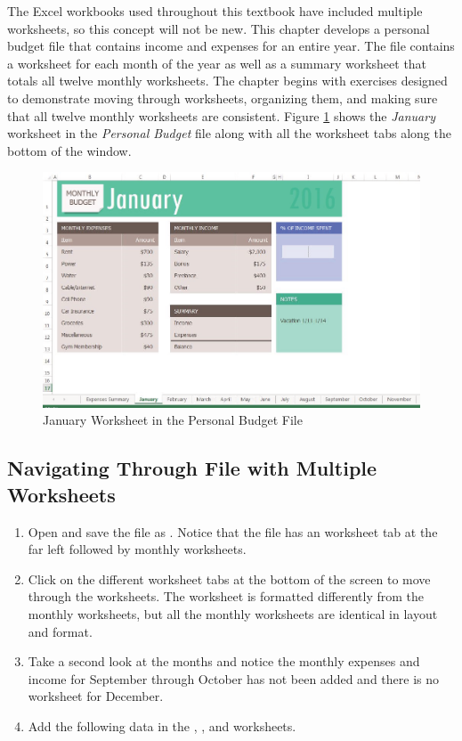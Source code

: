 The Excel workbooks used throughout this textbook have included multiple worksheets, so this concept will not be new. This chapter develops a personal budget file that contains income and expenses for an entire year. The file contains a worksheet for each month of the year as well as a summary worksheet that totals all twelve monthly worksheets. The chapter begins with exercises designed to demonstrate moving through worksheets, organizing them, and making sure that all twelve monthly worksheets are consistent. Figure \ref{06:fig01} shows the \textit{January} worksheet in the \textit{Personal Budget} file along with all the worksheet tabs along the bottom of the window.

\begin{figure}[H]
	\centering
	\includegraphics[width=\maxwidth{.95\linewidth}]{gfx/ch06_fig01}
	\caption{January Worksheet in the Personal Budget File}
	\label{06:fig01}
\end{figure}

\subsection{Navigating Through File with Multiple Worksheets}

\begin{enumbox}
	\begin{enumerate}
		\item Open  and save the file as . Notice that the file has an  worksheet tab at the far left followed by monthly worksheets.
		\item Click on the different worksheet tabs at the bottom of the screen to move through the worksheets. The  worksheet is formatted differently from the monthly worksheets, but all the monthly worksheets are identical in layout and format.
		\item Take a second look at the months and notice the monthly expenses and income for September through October has not been added and there is no worksheet for December. 
		\item Add the following data in the , , and  worksheets.
	\end{enumerate}
\end{enumbox}

